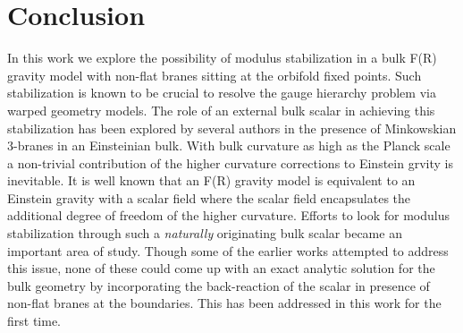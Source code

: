 \documentclass{article}
\begin{document}
\section{Conclusion}
\label{Conclusion}

In this work we explore the possibility of modulus stabilization in a bulk F(R) gravity model with non-flat branes sitting at the orbifold fixed points. Such stabilization is known to be crucial to resolve the gauge hierarchy problem via warped geometry models. The role of an external bulk scalar in achieving this stabilization has been explored by several authors in the presence  of Minkowskian 3-branes in an Einsteinian bulk.
With bulk curvature as high as the Planck scale a non-trivial contribution of the higher curvature corrections to Einstein grvity is inevitable. It is well known that an F(R) gravity model is equivalent to an Einstein gravity with a scalar field where the scalar field encapsulates the additional degree of freedom of the higher curvature.  Efforts to look for modulus stabilization through such a \emph{naturally} originating bulk scalar became an important area of study. Though  some of the earlier works attempted to address this issue, none of these could come up with an exact analytic solution for the bulk geometry by incorporating the back-reaction of the scalar in presence of  non-flat branes at the boundaries. This has been addressed in this work for the first time. 
\end{document}
